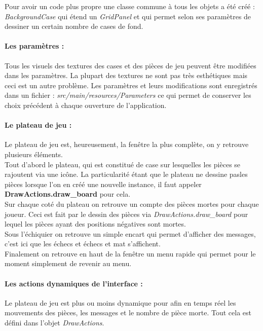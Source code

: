\documentclass[a4paper]{article}
\begin{document}
Pour avoir un code plus propre une classe commune à tous les objets a été créé : \textit{BackgroundCase} qui étend un \textit{GridPanel} et qui permet selon ses paramètres de dessiner un certain nombre de cases de fond.

\paragraph{Les paramètres :}Tous les visuels des textures des cases et des pièces de jeu peuvent être modifiées dans les paramètres. La plupart des textures ne sont pas très esthétiques mais ceci est un autre problème. Les paramètres et leurs modifications sont enregistrés dans un fichier : \textit{src/main/resources/Parameters} ce qui permet de conserver les choix précédent à chaque ouverture de l'application.

\paragraph{Le plateau de jeu :}Le plateau de jeu est, heureusement, la fenêtre la plus complète, on y retrouve plusieurs éléments. \\

Tout d'abord le plateau, qui est constitué de case sur lesquelles les pièces se rajoutent via une icône. La particularité étant que le plateau ne dessine pasles pièces lorsque l'on en créé une nouvelle instance, il faut appeler \textbf{DrawActions.draw\_board} pour cela. \\

Sur chaque coté du plateau on retrouve un compte des pièces mortes pour chaque joueur. Ceci est fait par le dessin des pièces via \textit{DrawActions.draw\_board} pour lequel les pièces ayant des positions négatives sont mortes. \\

Sous l'échiquier on retrouve un simple encart qui permet d'afficher des messages, c'est ici que les échecs et échecs et mat s'affichent. \\

Finalement on retrouve en haut de la fenêtre un menu rapide qui permet pour le moment simplement de revenir au menu.

\paragraph{Les actions dynamiques de l'interface :}Le plateau de jeu est plus ou moins dynamique pour afin en temps réel les mouvements des pièces, les messages et le nombre de pièce morte. Tout cela est défini dans l'objet \textit{DrawActions}. \\
\end{document}
